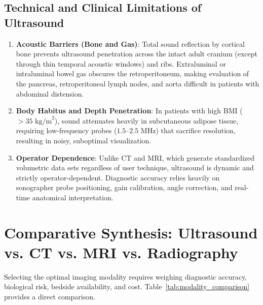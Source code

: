 \documentclass[11pt,a4paper]{article}
\begin{document}
\subsection{Technical and Clinical Limitations of Ultrasound}
\begin{enumerate}
    \item \textbf{Acoustic Barriers (Bone and Gas)}: Total sound reflection by cortical bone prevents ultrasound penetration across the intact adult cranium (except through thin temporal acoustic windows) and ribs. Extraluminal or intraluminal bowel gas obscures the retroperitoneum, making evaluation of the pancreas, retroperitoneal lymph nodes, and aorta difficult in patients with abdominal distension.
    \item \textbf{Body Habitus and Depth Penetration}: In patients with high BMI ($>35\text{ kg/m}^2$), sound attenuates heavily in subcutaneous adipose tissue, requiring low-frequency probes ($1.5\text{--}2.5\text{ MHz}$) that sacrifice resolution, resulting in noisy, suboptimal visualization.
    \item \textbf{Operator Dependence}: Unlike CT and MRI, which generate standardized volumetric data sets regardless of user technique, ultrasound is dynamic and strictly operator-dependent. Diagnostic accuracy relies heavily on sonographer probe positioning, gain calibration, angle correction, and real-time anatomical interpretation.
\end{enumerate}

\section{Comparative Synthesis: Ultrasound vs. CT vs. MRI vs. Radiography}

Selecting the optimal imaging modality requires weighing diagnostic accuracy, biological risk, bedside availability, and cost. Table~\ref{tab:modality_comparison} provides a direct comparison.
\end{document}
